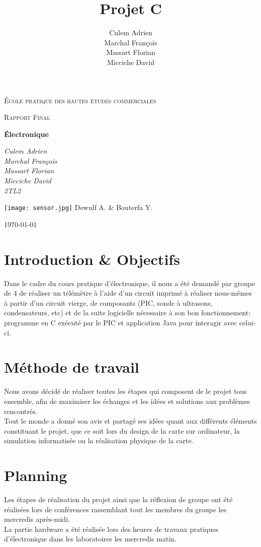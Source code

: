 \documentclass[a4paper]{article}
\title{Projet C}
\author{Culem Adrien \\ Marchal François\\Massart Florian \\Micciche David}
\begin{document}
\begin{titlepage}
	\centering
	{\scshape\LARGE École pratique des hautes études commerciales \par}
	\vspace{1cm}
	{\scshape\Large Rapport Final\par}
	\vspace{1.5cm}
	{\huge\bfseries Électronique \par}
	\vspace{1cm}
	{\Large\itshape 
    Culem Adrien\\Marchal François\\Massart Florian\\Micciche David\\2TL2\par}
    \texttt{[image: sensor.jpg]}
	\vfill
	Dewulf A. \& Bouterfa Y.

	\vfill

	{\large \today\par}
\end{titlepage}

\tableofcontents
\newpage

\section{Introduction \& Objectifs}
Dans le cadre du cours pratique d'électronique, il nous a été demandé par groupe de 4 de réaliser un télémètre à l’aide d’un circuit imprimé à réaliser nous-mêmes à partir d’un circuit vierge, de composants (PIC, sonde à ultrasons, condensateurs, etc) et de la suite logicielle nécessaire à son bon fonctionnement: programme en C exécuté par le PIC et application Java pour interagir avec celui-ci.

\section{Méthode de travail}
Nous avons décidé de réaliser toutes les étapes qui composent de le projet tous ensemble, afin de maximiser les échanges et les idées et solutions aux problèmes rencontrés. \\
Tout le monde a donné son avis et partagé ses idées quant aux différents éléments constituant le projet, que ce soit lors du design de la carte sur ordinateur, la simulation informatisée ou la réalisation physique de la carte.  

\section{Planning}
Les étapes de réalisation du projet ainsi que la réflexion de groupe ont été réalisées lors de conférences rassemblant tout les membres du groupe les mercredis après-midi. \\
La partie hardware a été réalisée lors des heures de travaux pratiques d'électronique dans les laboratoires les mercredis matin.
\end{document}
